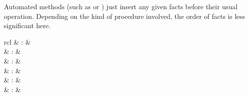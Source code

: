 \begin{isabellebody}
\begin{isamarkuptext}
  Automated methods (such as \hyperlink{method.simp}{\mbox{}} or \hyperlink{method.auto}{\mbox{}}) just
  insert any given facts before their usual operation.  Depending on
  the kind of procedure involved, the order of facts is less
  significant here.%
\end{isamarkuptext}%
\isamarkuptrue%
%
\isamarkuptrue%
%
\begin{isamarkuptext}%
\begin{matharray}{rcl}
    \hypertarget{command.lemma}{\hyperlink{command.lemma}{\mbox{}}} & : &  \\
    \hypertarget{command.theorem}{\hyperlink{command.theorem}{\mbox{}}} & : &  \\
    \hypertarget{command.corollary}{\hyperlink{command.corollary}{\mbox{}}} & : &  \\
    \hypertarget{command.schematic-lemma}{\hyperlink{command.schematic-lemma}{\mbox{}}} & : &  \\
    \hypertarget{command.schematic-theorem}{\hyperlink{command.schematic-theorem}{\mbox{}}} & : &  \\
    \hypertarget{command.schematic-corollary}{\hyperlink{command.schematic-corollary}{\mbox{}}} & : &  \\

\end{matharray}
\end{isamarkuptext}
\end{isabellebody}

